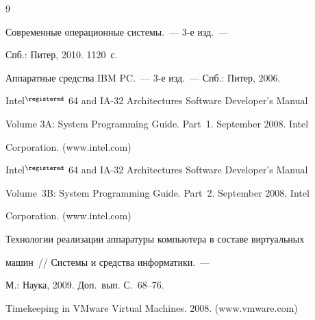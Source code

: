 {\small\frenchspacing


{%




\begin{thebibliography}{9}




 Современные операционные системы.~--- 3-е изд.~--- 


Спб.: Питер, 2010. 1120~с.









Аппаратные средства IBM PC.~--- 3-е изд.~--- Спб.: Питер, 2006.







Intel$^\registered$ 64 and IA-32 Architectures Software Developer's Manual 


Volume 3A: System Programming Guide. Part~1. September 2008. Intel 


Corporation. ({\sf www.intel.com})







Intel$^\registered$ 64 and IA-32 Architectures Software Developer's Manual 


Volume~3B: System Programming Guide. Part~2. September 2008. Intel 


Corporation. ({\sf www.intel.com})









Технологии реализации аппаратуры компьютера в составе виртуальных 


машин~/\!\!/ Системы и средства информатики.~--- 


М.: Наука, 2009.  Доп.\ вып. С.~68--76.





\label{end\stat}







Timekeeping in VMware Virtual Machines. 2008. ({\sf www.vmware.com})


 \end{thebibliography}


}


}





